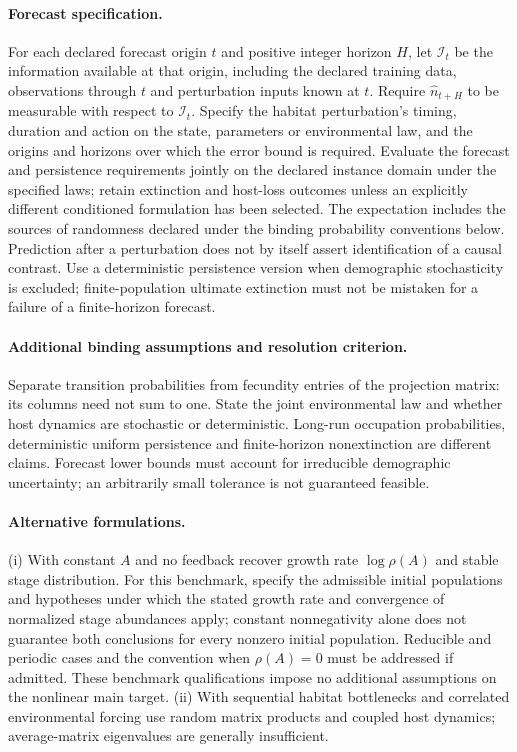 \documentclass[11pt]{article}
\begin{document}
\paragraph{Forecast specification.} For each declared forecast origin $t$ and positive integer horizon $H$, let $\mathcal I_t$ be the information available at that origin, including the declared training data, observations through $t$ and perturbation inputs known at $t$. Require $\widehat n_{t+H}$ to be measurable with respect to $\mathcal I_t$. Specify the habitat perturbation's timing, duration and action on the state, parameters or environmental law, and the origins and horizons over which the error bound is required. Evaluate the forecast and persistence requirements jointly on the declared instance domain under the specified laws; retain extinction and host-loss outcomes unless an explicitly different conditioned formulation has been selected. The expectation includes the sources of randomness declared under the binding probability conventions below. Prediction after a perturbation does not by itself assert identification of a causal contrast.
Use a deterministic persistence version when demographic stochasticity is excluded; finite-population ultimate extinction must not be mistaken for a failure of a finite-horizon forecast.
\paragraph{Additional binding assumptions and resolution criterion.} Separate transition probabilities from fecundity entries of the projection matrix: its columns need not sum to one. State the joint environmental law and whether host dynamics are stochastic or deterministic. Long-run occupation probabilities, deterministic uniform persistence and finite-horizon nonextinction are different claims. Forecast lower bounds must account for irreducible demographic uncertainty; an arbitrarily small tolerance is not guaranteed feasible.

\paragraph{Alternative formulations.} (i) With constant $A$ and no feedback recover growth rate $\log\rho(A)$ and stable stage distribution. For this benchmark, specify the admissible initial populations and hypotheses under which the stated growth rate and convergence of normalized stage abundances apply; constant nonnegativity alone does not guarantee both conclusions for every nonzero initial population. Reducible and periodic cases and the convention when $\rho(A)=0$ must be addressed if admitted. These benchmark qualifications impose no additional assumptions on the nonlinear main target. (ii) With sequential habitat bottlenecks and correlated environmental forcing use random matrix products and coupled host dynamics; average-matrix eigenvalues are generally insufficient.
\end{document}

